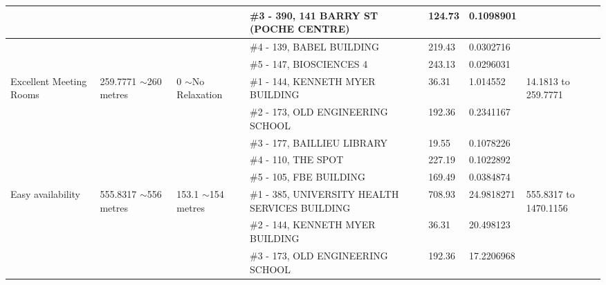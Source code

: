 \begin{table}[H]
{\begin{tabular}{|l|l|l|l|l|l|l|}
                        &                           &                          & \#3 - 390, 141 BARRY ST (POCHE CENTRE)                  & 124.73        & 0.1098901       &                           \\ \hline
                        &                           &                          & \#4 - 139, BABEL BUILDING                               & 219.43        & 0.0302716       &                           \\ \hline
                        &                           &                          & \#5 - 147, BIOSCIENCES 4                                & 243.13        & 0.0296031       &                           \\ \hline
Excellent Meeting Rooms & 259.7771 $\sim$260 metres & 0 $\sim$No Relaxation    & \#1 - 144, KENNETH MYER BUILDING                        & 36.31         & 1.014552        & 14.1813 to 259.7771       \\ \hline
                        &                           &                          & \#2 - 173, OLD ENGINEERING SCHOOL                       & 192.36        & 0.2341167       &                           \\ \hline
                        &                           &                          & \#3 - 177, BAILLIEU LIBRARY                             & 19.55         & 0.1078226       &                           \\ \hline
                        &                           &                          & \#4 - 110, THE SPOT                                     & 227.19        & 0.1022892       &                           \\ \hline
                        &                           &                          & \#5 - 105, FBE BUILDING                                 & 169.49        & 0.0384874       &                           \\ \hline
Easy availability       & 555.8317 $\sim$556 metres & 153.1 $\sim$154 metres   & \#1 - 385, UNIVERSITY HEALTH SERVICES BUILDING          & 708.93        & 24.9818271      & 555.8317 to 1470.1156     \\ \hline
                        &                           &                          & \#2 - 144, KENNETH MYER BUILDING                        & 36.31         & 20.498123       &                           \\ \hline
                        &                           &                          & \#3 - 173, OLD ENGINEERING SCHOOL                       & 192.36        & 17.2206968      &                           \\ \hline

\end{tabular}}
\end{table}

